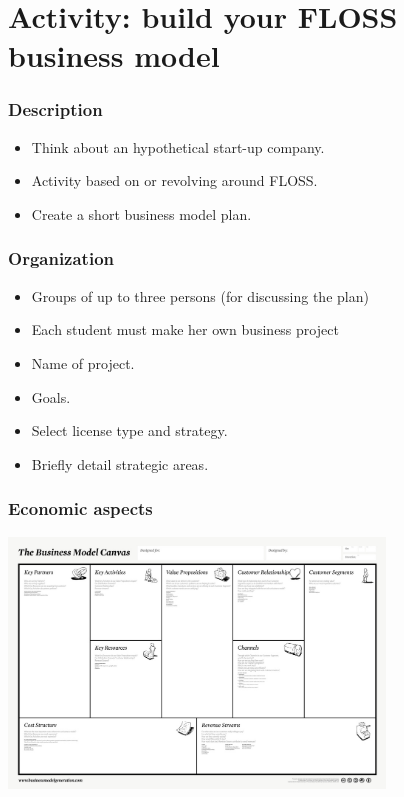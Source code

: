 
\section{Activity: build your FLOSS business model}

\begin{frame}
\frametitle{Description}
\begin{itemize}
  \item Think about an hypothetical start-up company.
  \item Activity based on or revolving around FLOSS.
  \item Create a short business model plan.
\end{itemize}
\end{frame}

\begin{frame}
\frametitle{Organization}

\begin{itemize}
 \item Groups of up to three persons (for discussing the plan)
\item Each student must make her own business project
 \item Name of project.
 \item Goals.
 \item Select license type and strategy.
 \item Briefly detail strategic areas.
\end{itemize}

\end{frame}

\begin{frame}
\frametitle{Economic aspects}

\includegraphics[width=10cm]{figs/business-model-canvas.jpg}

\end{frame}

